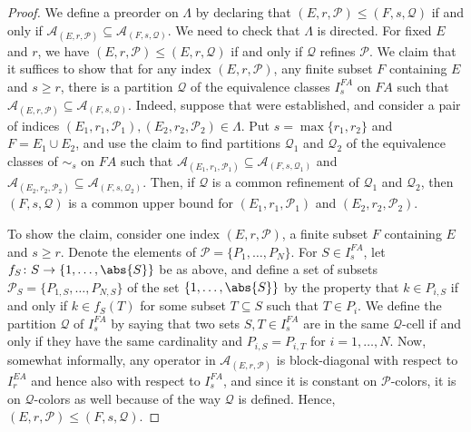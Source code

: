 \documentclass[12pt, a4paper, oneside]{amsart}
\newcommand{\0}{\mathbf{0}}
\newcommand{\1}{\mathbf{1}}
\newcommand{\Q}{\mathcal{Q}}   %
\newcommand{\A}{\mathscr{A}}
\renewcommand{\P}{\mathcal{P}} %
\begin{document}
\begin{proof}
	We define a preorder on \(\Lambda\) by declaring that \((E, r, \P) \leq (F, s, \Q)\) if and only if \(\A_{(E, r, \P)} \subseteq \A_{(F, s, \Q)}\). We need to check that \(\Lambda\) is directed. For fixed \(E\) and \(r\), we have \((E, r, \P) \leq (E, r, \Q)\) if and only if \(\Q\) refines \(\P\). We claim that it suffices to show that for any index \((E, r, \P)\), any finite subset \(F\) containing \(E\) and \(s \geq r\), there is a partition \(\Q\) of the equivalence classes \(I^{FA}_s\) on \(FA\) such that \(\A_{(E, r, \P)} \subseteq \A_{(F, s, \Q)}\). Indeed, suppose that were established, and consider a pair of indices \((E_1, r_1, \P_1), (E_2, r_2, \P_2) \in \Lambda\). Put \(s = \max\{r_1, r_2\}\) and \(F = E_1 \cup E_2\), and use the claim to find partitions \(\Q_1\) and \(\Q_2\) of the equivalence classes of \(\sim_s\) on \(FA\) such that \(\A_{(E_1, r_1, \P_1)} \subseteq \A_{(F, s, \Q_1)}\) and \(\A_{(E_2, r_2, \P_2)} \subseteq \A_{(F, s, \Q_2)}\). Then, if \(\Q\) is a common refinement of \(\Q_1\) and \(\Q_2\), then \((F, s, \Q)\) is a common upper bound for \((E_1, r_1, \P_1)\) and \((E_2, r_2, \P_2)\). 
	
	To show the claim, consider one index \((E, r, \P)\), a finite subset \(F\) containing \(E\) and \(s \geq r\). Denote the elements of \(\P = \{P_1, \ldots, P_N\}\). For \(S \in I_s^{FA}\), let \(f_S \colon S \to \{1, \ldots, \abs{S}\}\) be as above, and define a set of subsets \(\P_S = \{P_{1, S}, \ldots, P_{N, S}\}\) of the set \(\{1, \ldots, \abs{S}\}\) by the property that \(k \in P_{i, S}\) if and only if \(k \in f_S(T)\) for some subset \(T \subseteq S\) such that \(T \in P_i\). We define the partition \(\Q\) of \(I_s^{FA}\) by saying that two sets \(S, T \in I_s^{FA}\) are in the same \(\Q\)-cell if and only if they have the same cardinality and \(P_{i, S} = P_{i, T}\) for \(i = 1, \ldots, N\). Now, somewhat informally, any operator in \(\A_{(E, r, \P)}\) is block-diagonal with respect to \(I_r^{EA}\) and hence also with respect to \(I_s^{FA}\), and since it is constant on \(\P\)-colors, it is on \(\Q\)-colors as well because of the way \(\Q\) is defined. Hence, \((E, r, \P) \leq (F, s, \Q)\). 
	

\end{proof}
\end{document}
